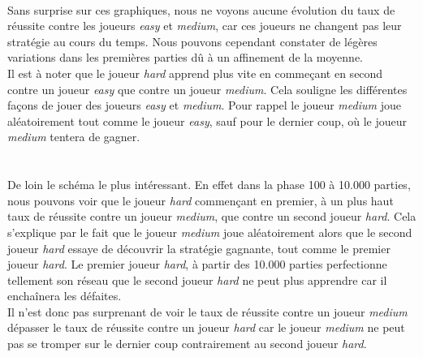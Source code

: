 \documentclass{article}
\begin{document}
  \paragraph{}
    Sans surprise sur ces graphiques, nous ne voyons aucune évolution du taux de réussite contre les joueurs \emph{easy} et \emph{medium}, 
    car ces joueurs ne changent pas leur stratégie au cours du temps.
    Nous pouvons cependant constater de légères variations dans les premières parties dû à un affinement de la moyenne.\\
    Il est à noter que le joueur \emph{hard} apprend plus vite en commeçant en second contre un joueur \emph{easy} que contre un joueur \emph{medium}.
    Cela souligne les différentes façons de jouer des joueurs \emph{easy} et \emph{medium}. Pour rappel le joueur \emph{medium} joue aléatoirement tout comme 
    le joueur \emph{easy}, sauf pour le dernier coup, où le joueur \emph{medium} tentera de gagner.
  
  \paragraph{}
    \\
    De loin le schéma le plus intéressant. En effet dans la phase 100 à 10.000 parties, nous pouvons voir que le joueur \emph{hard} commençant en premier, à un plus haut taux de réussite 
    contre un joueur \emph{medium}, que contre un second joueur \emph{hard}.
    Cela s'explique par le fait que le joueur \emph{medium} joue aléatoirement alors que le second joueur \emph{hard}
    essaye de découvrir la stratégie gagnante, tout comme le premier joueur \emph{hard}. Le premier joueur \emph{hard}, à partir des 10.000 parties
    perfectionne tellement son réseau que le second joueur \emph{hard} ne peut plus apprendre car il enchaînera les défaites.\\
    Il n'est donc pas surprenant de voir le taux de réussite contre un joueur \emph{medium} dépasser le taux de réussite contre un joueur \emph{hard} car 
    le joueur \emph{medium} ne peut pas se tromper sur le dernier coup contrairement au second joueur \emph{hard}.
\end{document}
